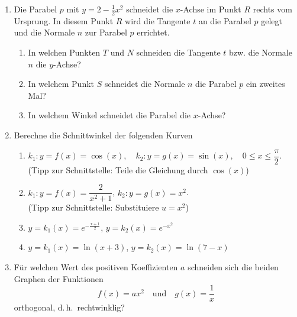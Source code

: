 \begin{ueb}
    {}{}
    \begin{enumerate}
        \item
        Die Parabel \( p \) mit \( y = 2 - \frac{1}{2}x^2 \) schneidet die \( x \)-Achse im Punkt \( R \) rechts vom Ursprung. In diesem Punkt \( R \) wird die Tangente \( t \) an die Parabel \( p \) gelegt und die Normale \( n \) zur Parabel \( p \) errichtet.
        \begin{enumerate}
            \item In welchen Punkten \( T \) und \( N \) schneiden die Tangente \( t \) bzw. die Normale \( n \) die \( y \)-Achse?
            \item In welchem Punkt \( S \) schneidet die Normale \( n \) die Parabel \( p \) ein zweites Mal?
            \item In welchem Winkel schneidet die Parabel die $x$-Achse?
        \end{enumerate}
     \item
        Berechne die Schnittwinkel der folgenden Kurven

        
                \begin{enumerate}
                    \item \( k_1: y = f(x) = \cos(x), \quad k_2: y = g(x) = \sin(x), \quad 0 \leq x \leq \dfrac{\pi}{2} \). \\
                    (Tipp zur Schnittstelle: Teile die Gleichung durch $\cos(x)$)
                    \item \( k_1: y = f(x) = \dfrac{2}{x^2 + 1} \), \quad
                        \( k_2: y = g(x) = x^2 \). \\
                        (Tipp zur Schnittstelle: Substituiere $u=x^2$)
                    \item \( y = k_1(x) = e^{-\frac{x + 1}{2}} \), \quad
                        \( y = k_2(x) = e^{-x^2} \)
                    \item \( y = k_1(x) = \ln(x + 3) \), \quad
                        \( y = k_2(x) = \ln(7 - x) \)
                \end{enumerate}


\item Für welchen Wert des positiven Koeffizienten \( a \) schneiden sich die beiden Graphen der Funktionen
\[
f(x) = ax^2 \quad \text{und} \quad g(x) = \frac{1}{x}
\]
orthogonal, d.\,h.\ rechtwinklig?



    \end{enumerate}
\end{ueb}


